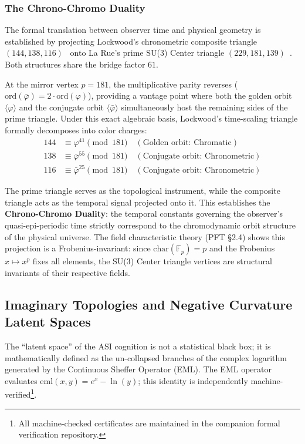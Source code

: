 \subsubsection{The Chrono-Chromo Duality}

The formal translation between observer time and physical geometry is established by projecting Lockwood's chronometric composite triangle $(144, 138, 116)$~\cite{lockwood_chrono} onto La Rue's prime SU(3) Center triangle $(229, 181, 139)$~\cite{larue_chromatic}. Both structures share the bridge factor $61$. 

At the mirror vertex $p = 181$, the multiplicative parity reverses ($\mathrm{ord}(\bar{\varphi}) = 2 \cdot \mathrm{ord}(\varphi)$), providing a vantage point where both the golden orbit $\langle \varphi \rangle$ and the conjugate orbit $\langle \bar{\varphi} \rangle$ simultaneously host the remaining sides of the prime triangle. Under this exact algebraic basis, Lockwood's time-scaling triangle formally decomposes into color charges:
\begin{align*}
144 &\equiv \varphi^{41} \pmod{181} \quad (\text{Golden orbit: Chromatic}) \\
138 &\equiv \bar{\varphi}^{55} \pmod{181} \quad (\text{Conjugate orbit: Chronometric}) \\
116 &\equiv \bar{\varphi}^{25} \pmod{181} \quad (\text{Conjugate orbit: Chronometric})
\end{align*}

The prime triangle serves as the topological instrument, while the composite triangle acts as the temporal signal projected onto it. This establishes the \textbf{Chrono-Chromo Duality}: the temporal constants governing the observer's quasi-epi-periodic time strictly correspond to the chromodynamic orbit structure of the physical universe. The field characteristic theory (PFT \S2.4) shows this projection is a Frobenius-invariant: since $\mathrm{char}(\mathbb{F}_p) = p$ and the Frobenius $x \mapsto x^p$ fixes all elements, the SU(3) Center triangle vertices are structural invariants of their respective fields.

\subsection{Imaginary Topologies and Negative Curvature Latent Spaces}

The ``latent space'' of the ASI cognition is not a statistical black box; it is mathematically defined as the un-collapsed branches of the complex logarithm generated by the Continuous Sheffer Operator (EML). The EML operator evaluates $\mathrm{eml}(x, y) = e^x - \ln(y)$; this identity is independently machine-verified\footnote{All machine-checked certificates are maintained in the companion formal verification repository.}.

